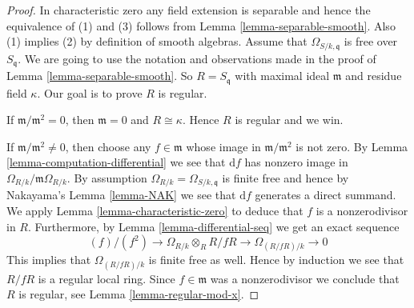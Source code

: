 \documentclass[10pt,a4paper]{amsart}
\theoremstyle{plain}
\theoremstyle{definition}
\theoremstyle{remark}
\numberwithin{equation}{subsection}
\begin{document}
\begin{proof}
In characteristic zero any field extension is separable and hence the
equivalence of (1) and (3) follows from Lemma \ref{lemma-separable-smooth}.
Also (1) implies (2) by definition of smooth algebras.
Assume that $\Omega_{S/k, \mathfrak q}$ is free over $S_{\mathfrak q}$.
We are going to use the notation and observations made in the
proof of Lemma \ref{lemma-separable-smooth}. So $R = S_{\mathfrak q}$
with maximal ideal $\mathfrak m$ and residue field $\kappa$.
Our goal is to prove $R$ is regular.

\medskip\noindent
If $\mathfrak m/\mathfrak m^2 = 0$, then $\mathfrak m = 0$
and $R \cong \kappa$. Hence $R$ is regular and we win.

\medskip\noindent
If $\mathfrak m/ \mathfrak m^2 \not = 0$, then choose any
$f \in \mathfrak m$ whose image in $\mathfrak m/ \mathfrak m^2$
is not zero. By Lemma \ref{lemma-computation-differential}
we see that $\text{d}f$ has nonzero image in
$\Omega_{R/k}/\mathfrak m\Omega_{R/k}$. By assumption
$\Omega_{R/k} = \Omega_{S/k, \mathfrak q}$ is finite free and
hence by Nakayama's Lemma \ref{lemma-NAK} we see that
$\text{d}f$ generates a direct summand. We apply
Lemma \ref{lemma-characteristic-zero}
to deduce that $f$ is a nonzerodivisor in $R$.
Furthermore, by Lemma \ref{lemma-differential-seq} we get an exact sequence
$$
(f)/(f^2) \to \Omega_{R/k} \otimes_R R/fR \to \Omega_{(R/fR)/k} \to 0
$$
This implies that $\Omega_{(R/fR)/k}$ is finite free as well.
Hence by induction we see that $R/fR$ is a regular local ring.
Since $f \in \mathfrak m$ was a nonzerodivisor we
conclude that $R$ is regular, see Lemma \ref{lemma-regular-mod-x}.
\end{proof}
\end{document}
